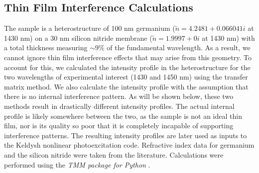 \subsection{Thin Film Interference Calculations}
\label{sec:thin_film_interference}

%	

The sample is a heterostructure of 100 nm germanium ($\tilde{n} = 4.2481 + 0.066041i$ at 1430 nm) on a 30 nm silicon nitride membrane ($\tilde{n}=1.9997 + 0i$ at 1430 nm) with a total thickness measuring $\sim 9$\% of the fundamental wavelength. As a result, we cannot ignore thin film interference effects that may arise from this geometry. To account for this, we calculated the intensity profile in the heterostructure for the two wavelengths of experimental interest (1430 and 1450 nm) using the transfer matrix method. We also calculate the intensity profile with the assumption that there is no internal interference pattern. As will be shown below, these two methods result in drastically different intensity profiles. The actual internal profile is likely somewhere between the two, as the sample is not an ideal thin film, nor is its quality so poor that it is completely incapable of supporting interference patterns. The resulting intensity profiles are later used as inputs to the Keldysh nonlinear photoexcitation code. Refractive index data for germanium \cite{nunleyOpticalConstantsGermanium2016} and the silicon nitride \cite{lukeBroadbandMidinfraredFrequency2015} were taken from the literature. Calculations were performed using the \textit{TMM package for Python} \cite{byrnesTmmSimulateLight2017,byrnesMultilayerOpticalCalculations2019}.

